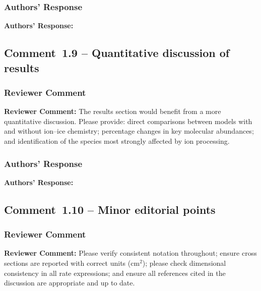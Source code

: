\documentclass[12pt]{article}
\newcommand{\reviewlabel}{\textbf{\textcolor{commentframe}{Reviewer Comment:}}}
\newcommand{\responselabel}{\textbf{\textcolor{responseframe}{Authors' Response:}}}
\begin{document}
\subsubsection{Authors' Response}
\begin{responsebox}
\responselabel{}

\end{responsebox}

\subsection{Comment~1.9 -- Quantitative discussion of results}

\subsubsection{Reviewer Comment}
\begin{reviewerbox}
\reviewlabel{} The results section would benefit from a more quantitative
discussion. Please provide: direct comparisons between models with and without
ion--ice chemistry; percentage changes in key molecular abundances; and
identification of the species most strongly affected by ion processing.
\end{reviewerbox}

\subsubsection{Authors' Response}
\begin{responsebox}
\responselabel{}

\end{responsebox}

\subsection{Comment~1.10 -- Minor editorial points}

\subsubsection{Reviewer Comment}
\begin{reviewerbox}
\reviewlabel{} Please verify consistent notation throughout; ensure cross
sections are reported with correct units (cm$^2$); please check dimensional
consistency in all rate expressions; and ensure all references cited in the
discussion are appropriate and up to date.
\end{reviewerbox}
\end{document}
